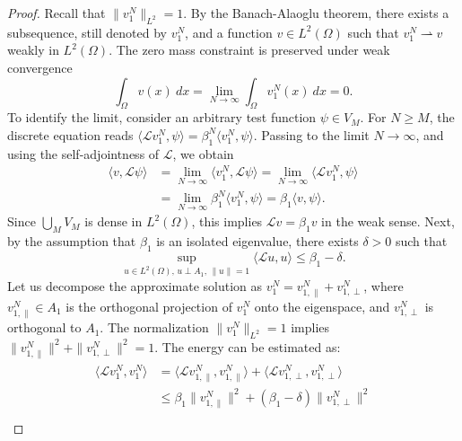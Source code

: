\documentclass[11pt, a4paper]{article}
\theoremstyle{break}
\theoremstyle{break}
\theoremstyle{break}
\theoremstyle{break}
\theoremstyle{break}
\theoremstyle{break}
\theoremstyle{break}
\theoremstyle{break}
\theoremstyle{break}
\theoremstyle{break}
\begin{document}
\begin{proof}
    Recall that $\|v_1^N\|_{L^2} = 1$. By the Banach-Alaoglu theorem, there exists a subsequence, still denoted by $v_1^N$, and a function $v \in L^2(\Omega)$ such that $v_1^N \rightharpoonup v$ weakly in $L^2(\Omega)$. The zero mass constraint is preserved under weak convergence
    \begin{equation}
        \int_\Omega v(x) \:dx = \lim_{N \to \infty} \int_\Omega v_1^N(x) \:dx = 0.
    \end{equation}
    To identify the limit, consider an arbitrary test function $\psi \in V_M$. For $N \geq M$, the discrete equation reads $\langle \mathcal{L} v_1^N, \psi \rangle = \beta_1^N \langle v_1^N, \psi \rangle$. Passing to the limit $N \to \infty$, and using the self-adjointness of $\mathcal{L}$, we obtain
    \begin{align}
        \langle v, \mathcal{L} \psi \rangle &= \lim_{N \to \infty} \langle v_1^N, \mathcal{L} \psi \rangle = \lim_{N \to \infty} \langle \mathcal{L} v_1^N, \psi \rangle \\
        &= \lim_{N \to \infty} \beta_1^N \langle v_1^N, \psi \rangle = \beta_1 \langle v, \psi \rangle.
    \end{align}
    Since $\bigcup_{M} V_M$ is dense in $L^2(\Omega)$, this implies $\mathcal{L} v = \beta_1 v$ in the weak sense.
    Next, by the assumption that $\beta_1$ is an isolated eigenvalue, there exists $\delta > 0$ such that
    \begin{equation}
        \sup_{u \in L^2(\Omega), \, u \perp A_1, \, \|u\|=1} \langle \mathcal{L} u, u \rangle \leq \beta_1 - \delta.
    \end{equation}
    Let us decompose the approximate solution as $v_1^N = v_{1, \parallel}^{N} + v_{1, \perp}^{N}$, where $v_{1, \parallel}^{N} \in A_1$ is the orthogonal projection of $v_1^N$ onto the eigenspace, and $v_{1, \perp}^{N}$ is orthogonal to $A_1$. The normalization $\|v_1^N\|_{L^2}=1$ implies $\|v_{1, \parallel}^{N}\|^2 + \|v_{1, \perp}^{N}\|^2 = 1$. The energy can be estimated as:
    \begin{align}
        \begin{split}
            \langle \mathcal{L} v_1^N, v_1^N \rangle &= \langle \mathcal{L} v_{1, \parallel}^{N}, v_{1, \parallel}^{N} \rangle + \langle \mathcal{L} v_{1, \perp}^{N}, v_{1, \perp}^{N} \rangle \\
            &\leq \beta_1 \|v_{1, \parallel}^{N}\|^2 + (\beta_1 - \delta) \|v_{1, \perp}^{N}\|^2 \\

\end{split}
\end{align}
\end{proof}
\end{document}
